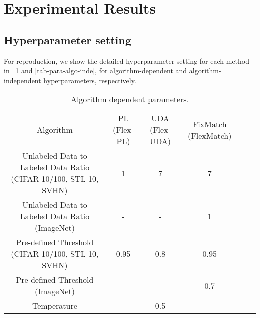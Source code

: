 \appendix
\section{Experimental Results}
\label{appendix:results}

\subsection{Hyperparameter setting}

For reproduction, we show the detailed hyperparameter setting for each method in \tablename~\ref{tab-para-algo-depen} and \ref{tab-para-algo-inde}, for algorithm-dependent and algorithm-independent hyperparameters, respectively.

\begin{table}[!htbp]
    \centering
    \caption{Algorithm dependent parameters.}
    \label{tab-para-algo-depen}
    \begin{adjustbox}{width=0.8\columnwidth,center}
    \begin{tabular}{cccccc}\toprule
Algorithm &  PL (Flex-PL) & UDA (Flex-UDA) & FixMatch (FlexMatch) \\\cmidrule(r){1-1} \cmidrule(lr){2-2}\cmidrule(lr){3-3}\cmidrule(l){4-4}
Unlabeled Data to Labeled Data Ratio (CIFAR-10/100, STL-10, SVHN)    &  1 & 7 & 7 \\\cmidrule(r){1-1}
\cmidrule(lr){2-2}\cmidrule(lr){3-3}\cmidrule(l){4-4}
Unlabeled Data to Labeled Data Ratio (ImageNet)    &  - & - & 1 \\\cmidrule(r){1-1}
\cmidrule(lr){2-2}\cmidrule(lr){3-3}\cmidrule(l){4-4}
Pre-defined Threshold (CIFAR-10/100, STL-10, SVHN) &  0.95  & 0.8 & 0.95\\ \cmidrule(r){1-1} \cmidrule(lr){2-2}\cmidrule(lr){3-3}\cmidrule(l){4-4}
Pre-defined Threshold (ImageNet) &  -  & - & 0.7\\ \cmidrule(r){1-1} \cmidrule(lr){2-2}\cmidrule(lr){3-3}\cmidrule(l){4-4}
Temperature &  -  & 0.5 & - \\ 
\bottomrule
    \end{tabular}
    \end{adjustbox}
    
\end{table}

